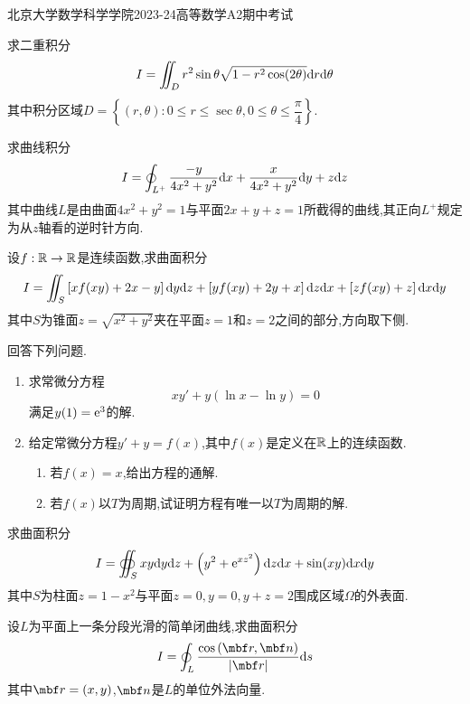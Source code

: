 \documentclass{ctexart}
\begin{document}
\pagestyle{empty}
\begin{center}\Large
    北京大学数学科学学院2023-24高等数学A2期中考试
\end{center}
\begin{problem}[1.(20\songti{分})]
    求二重积分
    \[I=\iint_{D}r^2\sin\theta\sqrt{1-r^2\cos(2\theta)}\mathrm{d} r\mathrm{d}\theta\]
    其中积分区域$D=\left\{(r,\theta):0\leqslant r\leqslant\sec\theta,0\leqslant\theta\leqslant\dfrac\pi4\right\}$.
\end{problem}
\begin{problem}[2.(20\songti{分})]
    求曲线积分
    \[I=\oint_{L^+}\dfrac{-y}{4x^2+y^2}\mathrm{d} x+\dfrac{x}{4x^2+y^2}\mathrm{d} y+z\mathrm{d} z\]
    其中曲线$L$是由曲面$4x^2+y^2=1$与平面$2x+y+z=1$所截得的曲线,其正向$L^+$规定为从$z$轴看的逆时针方向.
\end{problem}
\begin{problem}[3.(20\songti{分})]
    设$f:\mathbb{R}\to\mathbb{R}$是连续函数,求曲面积分
    \[I=\iint_S\left[xf(xy)+2x-y\right]\mathrm{d} y\mathrm{d} z+\left[yf(xy)+2y+x\right]\mathrm{d} z\mathrm{d} x+\left[zf(xy)+z\right]\mathrm{d} x\mathrm{d} y\]
    其中$S$为锥面$z=\sqrt{x^2+y^2}$夹在平面$z=1$和$z=2$之间的部分,方向取下侧.
\end{problem}
\begin{problem}[4.(20\songti{分})]
    回答下列问题.
    \begin{enumerate}[label=\tbf{(\arabic*)}]
        \item 求常微分方程
            \[xy'+y\left(\ln x-\ln y\right)=0\]
            满足$y(1)=\mathrm{e}^3$的解.
        \item 给定常微分方程$y'+y=f(x)$,其中$f(x)$是定义在$\mathbb{R}$上的连续函数.
            \begin{enumerate}[label=\tbf{(\alph*)}]
                \item 若$f(x)=x$,给出方程的通解.
                \item 若$f(x)$以$T$为周期,试证明方程有唯一以$T$为周期的解.
            \end{enumerate}
    \end{enumerate}    
\end{problem}

\begin{problem}[5.(10\songti{分})]
    求曲面积分
    \[I=\oiint_{S}xy\mathrm{d} y\mathrm{d} z+\left(y^2+\mathrm{e}^{xz^2}\right)\mathrm{d} z\mathrm{d} x+\sin(xy)\mathrm{d} x\mathrm{d} y\]
    其中$S$为柱面$z=1-x^2$与平面$z=0,y=0,y+z=2$围成区域$\Omega$的外表面.
\end{problem}

\begin{problem}[6.(10\songti{分})]
    设$L$为平面上一条分段光滑的简单闭曲线,求曲面积分
    \[I=\oint_{L}\dfrac{\cos\left(\mbf r,\mbf n\right)}{\left|\mbf r\right|}\di s\]
    其中$\mbf r=(x,y)$,$\mbf n$是$L$的单位外法向量.
\end{problem}
\end{document}

